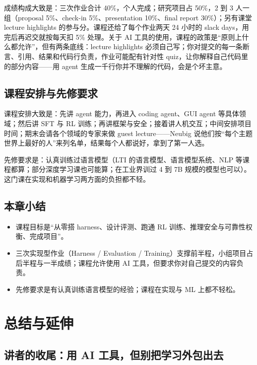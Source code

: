 \documentclass[a4paper]{article}
\begin{document}
成绩构成大致是：三次作业合计 40\%，个人完成；研究项目占 50\%，2 到 3 人一组（proposal 5\%、check-in 5\%、presentation 10\%、final report 30\%）；另有课堂 lecture highlights 的参与分。课程还给了每个作业两天 24 小时的 slack days，用完后再迟交就按每天扣 5\% 处理。关于 AI 工具的使用，课程的政策是“原则上什么都允许”，但有两条底线：lecture highlights 必须自己写；你对提交的每一条断言、引用、结果和代码行负责，作业可能配有针对性 quiz，让你解释自己代码里的部分内容——用 agent 生成一千行你并不理解的代码，会是个坏主意。

\subsection{课程安排与先修要求}

课程安排大致是：先讲 agent 能力，再进入 coding agent、GUI agent 等具体领域；然后讲 SFT 与 RL 训练；再讲框架与安全；接着讲人机交互；中间安排项目时间；期末会请各个领域的专家来做 guest lecture——Neubig 说他们按“每个主题世界上最好的人”来列名单，结果每个人都说好，拿到了第一人选。

先修要求是：认真训练过语言模型（LTI 的语言模型、语言模型系统、NLP 等课程都算；部分深度学习课也可能算；在工业界训过 4 到 7B 规模的模型也可以）。这门课在实现和机器学习两方面的负担都不轻。

\subsection{本章小结}

\begin{itemize}
\item 课程目标是“从零搭 harness、设计评测、跑通 RL 训练、推理安全与可靠性权衡、完成项目”。
\item 三次实现型作业（Harness / Evaluation / Training）支撑前半程，小组项目占后半程与一半成绩；课程允许使用 AI 工具，但要求你对自己提交的内容负责。
\item 先修要求是有认真训练语言模型的经验；课程在实现与 ML 上都不轻松。
\end{itemize}

\section{总结与延伸}

\subsection{讲者的收尾：用 AI 工具，但别把学习外包出去}
\end{document}
